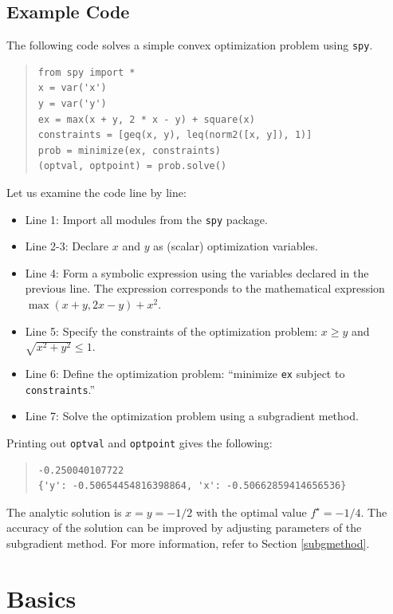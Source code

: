 \documentclass[12pt]{article}
\begin{document}
\subsection{Example Code}
The following code solves a simple convex optimization problem using \verb'spy'.

\begin{quote}
\begin{verbatim}
from spy import *
x = var('x')
y = var('y')
ex = max(x + y, 2 * x - y) + square(x)
constraints = [geq(x, y), leq(norm2([x, y]), 1)]
prob = minimize(ex, constraints)
(optval, optpoint) = prob.solve()
\end{verbatim}
\end{quote}

\noindent Let us examine the code line by line:

\begin{itemize}
\item Line 1: Import all modules from the \verb'spy' package.
\item Line 2-3: Declare $x$ and $y$ as (scalar) optimization variables.
\item Line 4: Form a symbolic expression using the variables declared in the previous line. The expression corresponds to the mathematical expression $\max(x+y,2x-y)+x^2$.
\item Line 5: Specify the constraints of the optimization problem: $x \geq y$ and $\sqrt{x^2+y^2} \leq 1$.
\item Line 6: Define the optimization problem: ``minimize \verb'ex' subject to \verb'constraints'.''
\item Line 7: Solve the optimization problem using a subgradient method.
\end{itemize}

\noindent Printing out \verb'optval' and \verb'optpoint' gives the following:

\begin{quote}
\begin{verbatim}
-0.250040107722
{'y': -0.50654454816398864, 'x': -0.50662859414656536}
\end{verbatim}
\end{quote}

\noindent The analytic solution is $x=y=-1/2$ with the optimal value $f^\star = -1/4$. The accuracy of the solution can be improved by adjusting parameters of the subgradient method. For more information, refer to Section \ref{subgmethod}.

\section{Basics}
\end{document}
